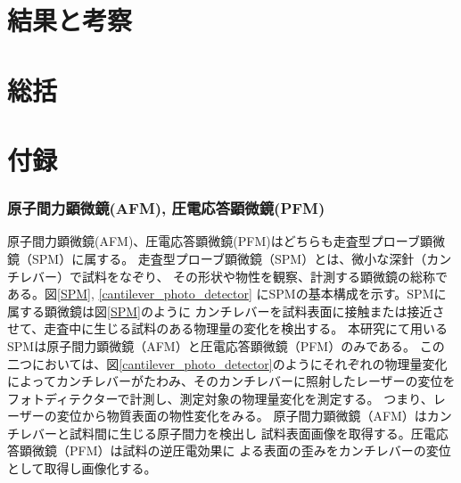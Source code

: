 \documentclass[dvipdfmx,12pt,a4paper]{jreport}
\begin{document}
	\chapter{結果と考察}
	\chapter{総括}
	\chapter{付録}
	\subsection{原子間力顕微鏡(AFM), 圧電応答顕微鏡(PFM)}
	原子間力顕微鏡(AFM)、圧電応答顕微鏡(PFM)はどちらも走査型プローブ顕微鏡（SPM）に属する。
	走査型プローブ顕微鏡（SPM）とは、微小な深針（カンチレバー）で試料をなぞり、
	その形状や物性を観察、計測する顕微鏡の総称である。図\ref{SPM}, \ref{cantilever_photo_detector}
	にSPMの基本構成を示す。SPMに属する顕微鏡は図\ref{SPM}のように
	カンチレバーを試料表面に接触または接近させて、走査中に生じる試料のある物理量の変化を検出する。
	本研究にて用いるSPMは原子間力顕微鏡（AFM）と圧電応答顕微鏡（PFM）のみである。
	この二つにおいては、図\ref{cantilever_photo_detector}のようにそれぞれの物理量変化
	によってカンチレバーがたわみ、そのカンチレバーに照射したレーザーの変位を
	フォトディテクターで計測し、測定対象の物理量変化を測定する。
	つまり、レーザーの変位から物質表面の物性変化をみる。
	原子間力顕微鏡（AFM）はカンチレバーと試料間に生じる原子間力を検出し
	試料表面画像を取得する。圧電応答顕微鏡（PFM）は試料の逆圧電効果に
	よる表面の歪みをカンチレバーの変位として取得し画像化する。
\end{document}
